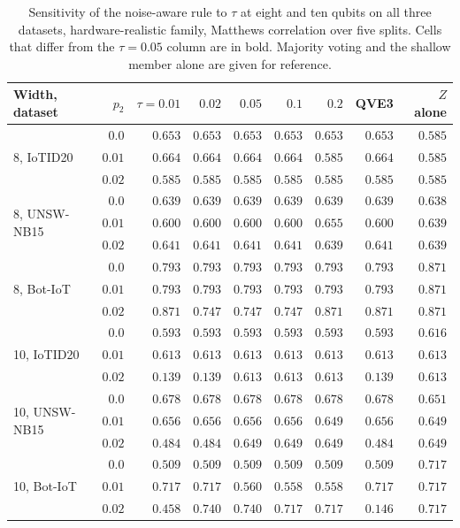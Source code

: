 \begin{table}[t]
\centering
\caption{Sensitivity of the noise-aware rule to $\tau$ at eight and ten qubits on all
three datasets, hardware-realistic family, Matthews correlation over five splits. Cells
that differ from the $\tau = 0.05$ column are in bold. Majority voting and the shallow
member alone are given for reference.}
\label{tab:tauwidth}
\footnotesize
\begin{tabular}{@{}lrrrrrrrr@{}}
\toprule
Width, dataset & $p_2$ & $\tau = 0.01$ & $0.02$ & $0.05$ & $0.1$ & $0.2$ & QVE3 & $Z$ alone \\
\midrule
\multirow{3}{*}{8, IoTID20}
 & $0.0$ & $0.653$ & $0.653$ & $0.653$ & $0.653$ & $0.653$ & $0.653$ & $0.585$ \\
 & $0.01$ & $0.664$ & $0.664$ & $0.664$ & $0.664$ & $\mathbf{0.585}$ & $0.664$ & $0.585$ \\
 & $0.02$ & $0.585$ & $0.585$ & $0.585$ & $0.585$ & $0.585$ & $0.585$ & $0.585$ \\
\midrule
\multirow{3}{*}{8, UNSW-NB15}
 & $0.0$ & $0.639$ & $0.639$ & $0.639$ & $0.639$ & $0.639$ & $0.639$ & $0.638$ \\
 & $0.01$ & $0.600$ & $0.600$ & $0.600$ & $0.600$ & $\mathbf{0.655}$ & $0.600$ & $0.639$ \\
 & $0.02$ & $0.641$ & $0.641$ & $0.641$ & $0.641$ & $\mathbf{0.639}$ & $0.641$ & $0.639$ \\
\midrule
\multirow{3}{*}{8, Bot-IoT}
 & $0.0$ & $0.793$ & $0.793$ & $0.793$ & $0.793$ & $0.793$ & $0.793$ & $0.871$ \\
 & $0.01$ & $0.793$ & $0.793$ & $0.793$ & $0.793$ & $0.793$ & $0.793$ & $0.871$ \\
 & $0.02$ & $\mathbf{0.871}$ & $0.747$ & $0.747$ & $0.747$ & $\mathbf{0.871}$ & $0.871$ & $0.871$ \\
\midrule
\multirow{3}{*}{10, IoTID20}
 & $0.0$ & $0.593$ & $0.593$ & $0.593$ & $0.593$ & $0.593$ & $0.593$ & $0.616$ \\
 & $0.01$ & $0.613$ & $0.613$ & $0.613$ & $0.613$ & $0.613$ & $0.613$ & $0.613$ \\
 & $0.02$ & $\mathbf{0.139}$ & $\mathbf{0.139}$ & $0.613$ & $0.613$ & $0.613$ & $0.139$ & $0.613$ \\
\midrule
\multirow{3}{*}{10, UNSW-NB15}
 & $0.0$ & $0.678$ & $0.678$ & $0.678$ & $0.678$ & $0.678$ & $0.678$ & $0.651$ \\
 & $0.01$ & $0.656$ & $0.656$ & $0.656$ & $0.656$ & $\mathbf{0.649}$ & $0.656$ & $0.649$ \\
 & $0.02$ & $\mathbf{0.484}$ & $\mathbf{0.484}$ & $0.649$ & $0.649$ & $0.649$ & $0.484$ & $0.649$ \\
\midrule
\multirow{3}{*}{10, Bot-IoT}
 & $0.0$ & $0.509$ & $0.509$ & $0.509$ & $0.509$ & $0.509$ & $0.509$ & $0.717$ \\
 & $0.01$ & $\mathbf{0.717}$ & $\mathbf{0.717}$ & $0.560$ & $\mathbf{0.558}$ & $\mathbf{0.558}$ & $0.717$ & $0.717$ \\
 & $0.02$ & $\mathbf{0.458}$ & $0.740$ & $0.740$ & $\mathbf{0.717}$ & $\mathbf{0.717}$ & $0.146$ & $0.717$ \\
\bottomrule
\end{tabular}
\end{table}
